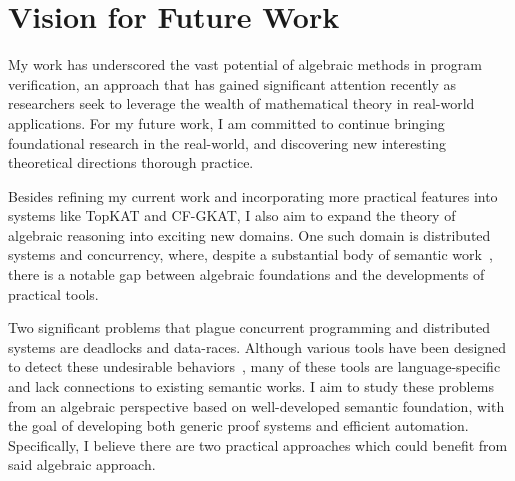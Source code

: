 \documentclass[11pt,a4paper,sans]{moderncv} %
\begin{document}

\newpage
\section{Vision for Future Work}

My work has underscored the vast potential of algebraic methods in program verification, an approach that has gained significant attention recently as researchers seek to leverage the wealth of mathematical theory in real-world applications.
For my future work, I am committed to continue bringing foundational research in the real-world, and discovering new interesting theoretical directions thorough practice.

Besides refining my current work and incorporating more practical features into systems like TopKAT and CF-GKAT, I also aim to expand the theory of algebraic reasoning into exciting new domains. 
One such domain is distributed systems and concurrency, where, despite a substantial body of semantic work~\cite{hoare_ConcurrentKleeneAlgebra_2011,kappe_ConcurrentKleeneAlgebra_2020,kappe_ConcurrentKleeneAlgebra_2018,wagemaker_PartiallyObservableConcurrent_2020,mciver_ProbabilisticConcurrentKleene_2013}, there is a notable gap between algebraic foundations and the developments of practical tools.

Two significant problems that plague concurrent programming and distributed systems are deadlocks and data-races.
Although various tools have been designed to detect these undesirable behaviors~\cite{williams_StaticDeadlockDetection_2005,masticola_StaticDetectionDeadlocks_1993,engler_RacerXEffectiveStatic_2003,naik_EffectiveStaticDeadlock_2009}, many of these tools are language-specific and lack connections to existing semantic works. 
I aim to study these problems from an algebraic perspective based on well-developed semantic foundation, with the goal of developing both generic proof systems and efficient automation. 
Specifically, I believe there are two practical approaches which could benefit from said algebraic approach.

\end{document}
